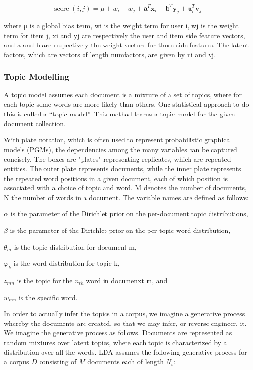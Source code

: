 \[
  \operatorname{score}(i, j) = \mu + w_i + w_j + \mathbf{a}^T \mathbf{x}_i + \mathbf{b}^T \mathbf{y}_j + {\mathbf u}_i^T {\mathbf v}_j
  \]

where μ is a global bias term, wi is the weight term for user i, wj is the weight term for item j, xi and yj are respectively the user and item side feature vectors, and a and b are respectively the weight vectors for those side features. The latent factors, which are vectors of length numfactors, are given by ui and vj.

\subsubsection{Topic Modelling}

A topic model assumes each document is a mixture of a set of topics, where for each topic some words are more likely than others. One statistical approach to do this is called a “topic model”. This method learns a topic model for the given document collection.

With plate notation, which is often used to represent probabilistic graphical models (PGMs), the dependencies among the many variables can be captured concisely. The boxes are "plates" representing replicates, which are repeated entities. The outer plate represents documents, while the inner plate represents the repeated word positions in a given document, each of which position is associated with a choice of topic and word. M denotes the number of documents, N the number of words in a document. The variable names are defined as follows:

$\alpha$ is the parameter of the Dirichlet prior on the per-document topic distributions,

$\beta$ is the parameter of the Dirichlet prior on the per-topic word distribution,

$\theta_{m}$ is the topic distribution for document m,

$\varphi_{k}$ is the word distribution for topic k,

$z_{mn}$ is the topic for the $n_{th}$ word in documenxt m, and 

$w_{mn}$ is the specific word.


In order to actually infer the topics in a corpus, we imagine a generative process whereby the documents are created, so that we may infer, or reverse engineer, it. We imagine the generative process as follows. Documents are represented as random mixtures over latent topics, where each topic is characterized by a distribution over all the words. LDA assumes the following generative process for a corpus $D$ consisting of $M$ documents each of length $N_{i}$:

